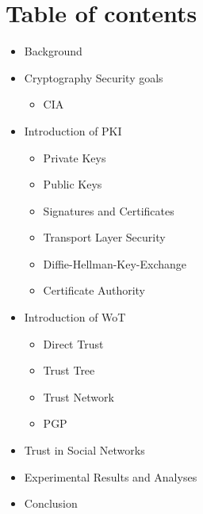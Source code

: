 \section{Table of contents}
\begin{frame}
    \begin{itemize}
        \item<1> Background
        \item<1> Cryptography Security goals
            \begin{itemize}
                \item<1> CIA
            \end{itemize}
        \item<1> Introduction of PKI
            \begin{itemize}
                \item<1> Private Keys
                \item<1> Public Keys
                \item<1> Signatures and Certificates
                \item<1> Transport Layer Security
                \item<1> Diffie-Hellman-Key-Exchange
                \item<1> Certificate Authority
            \end{itemize}
        \item<1> Introduction of WoT
            \begin{itemize}
                \item<1> Direct Trust
                \item<1> Trust Tree
                \item<1> Trust Network
                \item<1> PGP
            \end{itemize}
        \item<1> Trust in Social Networks
        \item<1> Experimental Results and Analyses
        \item<1> Conclusion
    \end{itemize}
\end{frame}

